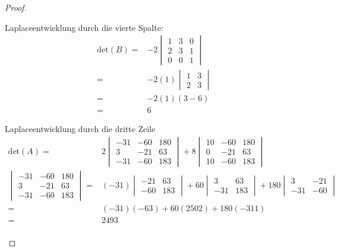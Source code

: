 \begin{proof}
	\begin{parts}
	\item Laplaceentwicklung durch die vierte Spalte:
		\begin{align*}
			\text{det}(B)=&-2
			\begin{vmatrix}
				1 & 3 & 0 \\ 2 & 3 & 1 \\ 0 & 0 & 1
			\end{vmatrix}\\
			=&-2(1)
			\begin{vmatrix}
				1 & 3 \\ 2 & 3
			\end{vmatrix}\\
			=&-2(1)(3-6)\\
			=&6
		\end{align*}
	\item Laplaceentwicklung durch die dritte Zeile
		\begin{align*}
			\text{det}(A)=&2
			\begin{vmatrix}
				-31 & -60 & 180 \\ 3 & -21 & 63 \\ -31 & -60 & 183
			\end{vmatrix}
			+8
			\begin{vmatrix}
				10 & -60 & 180 \\ 0 & -21 & 63 \\ 10 & -60 & 183
			\end{vmatrix}\\
			\begin{vmatrix}
				-31 & -60 & 180 \\ 3 & -21 & 63 \\ -31 & -60 & 183
			\end{vmatrix}=&(-31)
			\begin{vmatrix}
				-21 & 63 \\ -60 & 183
			\end{vmatrix}
			+60
			\begin{vmatrix}
				3 & 63 \\ -31 & 183
			\end{vmatrix}
			+180
			\begin{vmatrix}
				3 & -21 \\ -31 & -60
			\end{vmatrix}\\
			=&(-31)(-63)+60(2502)+180(-311)\\
			=&2493\\

\end{align*}
\end{parts}
\end{proof}
